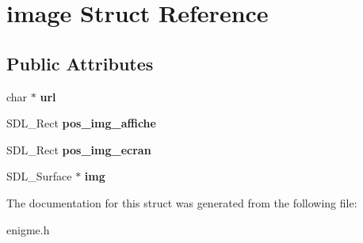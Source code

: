 \hypertarget{structimage}{}\section{image Struct Reference}
\label{structimage}
\subsection*{Public Attributes}
\begin{DoxyCompactItemize}
\item 
\mbox{\label{structimage_afff0b667f990ebc4d36da4001c3b61d9}} 
char $\ast$ {\bfseries url}
\item 
\mbox{\label{structimage_a1d7c4c377c566638a1b0314ef80abcc6}} 
S\+D\+L\+\_\+\+Rect {\bfseries pos\+\_\+img\+\_\+affiche}
\item 
\mbox{\label{structimage_a5da4718d620337efa32aee2012755239}} 
S\+D\+L\+\_\+\+Rect {\bfseries pos\+\_\+img\+\_\+ecran}
\item 
\mbox{\label{structimage_a27c5d076eb3f7ede915b271bf8b3a695}} 
S\+D\+L\+\_\+\+Surface $\ast$ {\bfseries img}
\end{DoxyCompactItemize}


The documentation for this struct was generated from the following file\+:\begin{DoxyCompactItemize}
\item 
enigme.\+h\end{DoxyCompactItemize}
